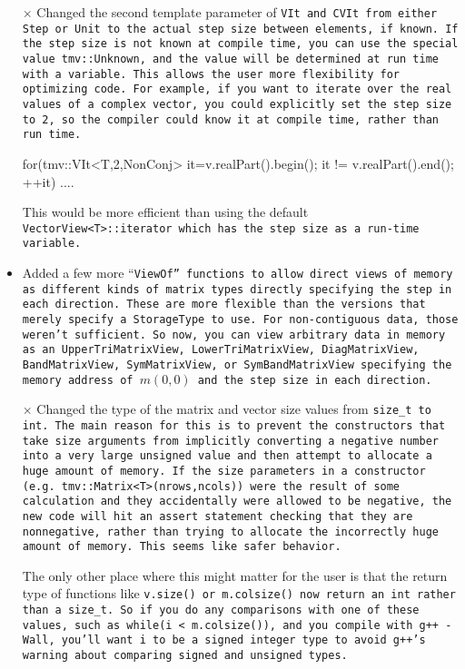 \begin{itemize}
\item[$\times$]
Changed the second template parameter of \tt{VIt} and \tt{CVIt} from either \tt{Step} or \tt{Unit} to the actual step size between elements, if known.  If the step size is not known at compile time, you can use the special value \tt{tmv::Unknown}, and the value will be determined at run time with a variable.  This allows the user more flexibility for optimizing code.  For example, if you want to iterate over the real values of a complex vector, you could explicitly set the step size to 2, so the compiler could know it at compile time, rather than run time.
\begin{tmvcode}
for(tmv::VIt<T,2,NonConj> it=v.realPart().begin(); 
    it != v.realPart().end(); ++it) {
  ....
}
\end{tmvcode}
This would be more efficient than using the default \tt{VectorView<T>::iterator} which has the step size as a run-time variable.

\item 
Added a few more ``\tt{ViewOf}'' functions to allow direct views of memory as different kinds of matrix types directly specifying the step in each direction.  These are more flexible than the versions that merely specify a \tt{StorageType} to use.  For non-contiguous data, those weren't sufficient.  So now, you can view arbitrary data in memory as an \tt{UpperTriMatrixView}, \tt{LowerTriMatrixView},
\tt{DiagMatrixView}, \tt{BandMatrixView}, \tt{SymMatrixView}, or \tt{SymBandMatrixView} specifying the memory address of $m(0,0)$ and the step size in each direction.

\item[$\times$]
Changed the type of the matrix and vector size values from \tt{size\_t} to \tt{int}.  The main reason for this is to prevent the constructors that take size arguments from implicitly converting a negative number into a very large unsigned value and then attempt to allocate a huge amount of memory.  If the size parameters in a constructor (e.g. \tt{tmv::Matrix<T>(nrows,ncols)}) were the result of some calculation and they accidentally were allowed to be negative, the new code will hit an assert statement checking that they are nonnegative, rather than trying to allocate the incorrectly huge amount of memory.  This seems like safer behavior.

The only other place where this might matter for the user is that the return type of functions like \tt{v.size()} or \tt{m.colsize()} now return an \tt{int} rather than a \tt{size\_t}.  
So if you do any comparisons with one of these values, such as \tt{while(i < m.colsize())}, and you compile with \tt{g++ -Wall}, you'll want i to be a signed integer type to avoid \tt{g++}'s warning about comparing signed and unsigned types.


\end{itemize}
